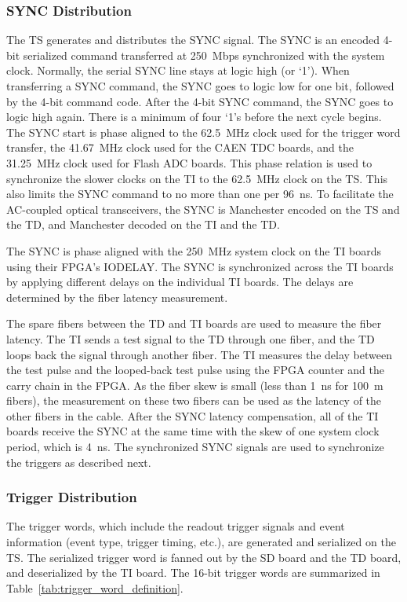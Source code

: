 \subsubsection{SYNC Distribution}

The TS generates and distributes the SYNC signal.  The SYNC is an encoded 4-bit serialized command transferred at
250~Mbps synchronized with the system clock.  Normally, the serial SYNC line stays at logic high (or ‘1’). When
transferring a SYNC command, the SYNC goes to logic low for one bit, followed by the 4-bit command code.  After the
4-bit SYNC command, the SYNC goes to logic high again. There is a minimum of four ‘1’s before the next cycle begins.
The SYNC start is phase aligned to the 62.5~MHz clock used for the trigger word transfer, the 41.67~MHz clock used
for the CAEN TDC boards, and the 31.25~MHz clock used for Flash ADC boards. This phase relation is used to synchronize
the slower clocks on the TI to the 62.5~MHz clock on the TS.  This also limits the SYNC command to no more than one per
96~ns. To facilitate the AC-coupled optical transceivers, the SYNC is Manchester encoded on the TS and the TD, and
Manchester decoded on the TI and the TD.

The SYNC is phase aligned with the 250~MHz system clock on the TI boards using their FPGA’s IODELAY. The SYNC
is synchronized across the TI boards by applying different delays on the individual TI boards. The delays are
determined by the fiber latency measurement.  

The spare fibers between the TD and TI boards are used to measure the fiber latency. The TI sends a test signal to
the TD through one fiber, and the TD loops back the signal through another fiber. The TI measures the delay between
the test pulse and the looped-back test pulse using the FPGA counter and the carry chain in the FPGA. As the fiber skew
is small (less than 1~ns for 100~m fibers), the measurement on these two fibers can be used as the latency of the other
fibers in the cable.  After the SYNC latency compensation, all of the TI boards receive the SYNC at the same time with
the skew of one system clock period, which is 4~ns.  The synchronized SYNC signals are used to synchronize the triggers
as described next.

\subsubsection{Trigger Distribution}

The trigger words, which include the readout trigger signals and event information (event type, trigger timing, etc.),
are generated and serialized on the TS. The serialized trigger word is fanned out by the SD board and the TD board,
and deserialized by the TI board. The 16-bit trigger words are summarized in Table~\ref{tab:trigger_word_definition}.  

